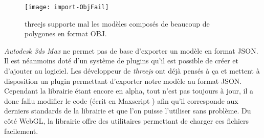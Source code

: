 \begin{figure}
	\centering
	\texttt{[image: import-ObjFail]}
	\caption{threejs supporte mal les modèles composés de beaucoup de polygones en format OBJ.}
	\label{fig:import-objfail}
\end{figure}

\textit{Autodesk 3ds Max} ne permet pas de base d'exporter un modèle en format JSON. Il est néanmoins doté d'un système de plugins qu'il est possible de créer et d'ajouter au logiciel. Les développeur de \textit{threejs} ont déjà pensés à ça et mettent à disposition un plugin permettant d'exporter notre modèle au format JSON. Cependant la librairie étant encore en alpha, tout n'est pas toujours à jour, il a donc fallu modifier le code (écrit en Maxscript \cite{autodesk-maxscript}) afin qu'il corresponde aux derniers standards de la librairie et que l'on puisse l'utiliser sans problème. Du côté WebGL, la librairie offre des utilitaires permettant de charger ces fichiers facilement.